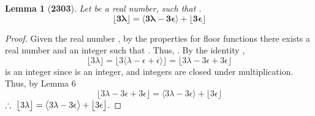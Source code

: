 \documentclass[preview]{standalone}
\newtheorem{lemma}{Lemma}
\begin{document}
\begin{lemma}[\textbf{2303}]
    Let \bm{$\lambda$} be a real number, 
    such that \bm{$\big \lfloor \lambda \big \rfloor + \epsilon = \lambda$}.
    \begin{equation*}
        \bm{
            \big \lfloor 3 \lambda \big \rfloor 
                =
            \big \langle 
                3 \lambda - 3 \epsilon 
            \big \rangle
                +
            \big \lfloor 3 \epsilon \big \rfloor 
        }
    \end{equation*}
\end{lemma}

\begin{proof}
    Given the real number \bm{$\lambda$}, 
    by the properties for floor functions
    there exists a real number \bm{$\epsilon$}
    and an integer \bm{$\lambda - \epsilon$} such that 
    \bm{$\lfloor \lambda \rfloor = \lambda - \epsilon$}.
    Thus, \bm{$\lambda = \lambda - \epsilon + \epsilon$}.
    By the identity \bm{$\lambda$},
    \begin{equation*}
        \Big \lfloor 3 \lambda \Big \rfloor 
            =
        \Big \lfloor 
                3 
                \big \langle 
                    \lambda - \epsilon + \epsilon 
                \big \rangle 
        \Big \rfloor
            =
        \Big \lfloor 
            3 \lambda - 3 \epsilon + 3 \epsilon 
        \Big \rfloor
    \end{equation*}
    \bm{$3 \lambda - 3 \epsilon$} is an integer 
    since \bm{$\lambda - \epsilon$} is an integer, 
    and integers are closed under multiplication.
    Thus, by Lemma 6
    \begin{equation*} 
        \Big \lfloor 
                3 \lambda - 3 \epsilon + 3 \epsilon 
        \Big \rfloor
            =
        \Big \langle 3 \lambda - 3 \epsilon \Big \rangle
            + 
        \Big \lfloor            
            3 \epsilon 
        \Big \rfloor
    \end{equation*}
    $\therefore \text{\space} \relax{
        \big \lfloor 3 \lambda \big \rfloor 
            =
        \big \langle 
            3 \lambda - 3 \epsilon 
        \big \rangle
            +
        \big \lfloor 3 \epsilon \big \rfloor
    }$.
\end{proof}
\end{document}
